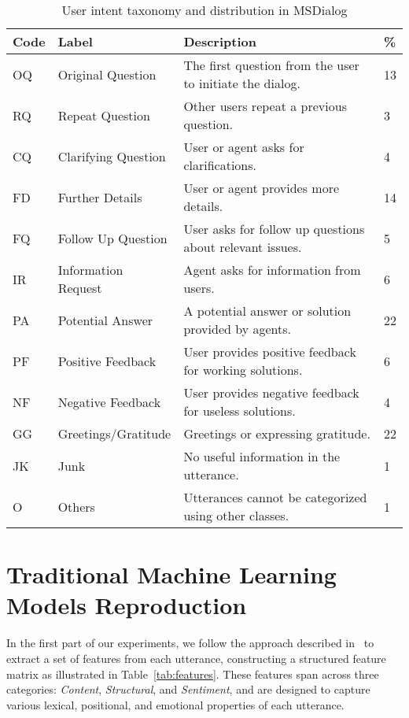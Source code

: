 \documentclass{article}
\begin{document}
\begin{table}[H]
\centering
\caption{User intent taxonomy and distribution in MSDialog}
\label{tab:taxonomy}
\begin{tabular}{llll}
\hline
\textbf{Code} & \textbf{Label} & \textbf{Description} & \textbf{\%} \\
\hline
OQ & Original Question & The first question from the user to initiate the dialog. & 13 \\
RQ & Repeat Question & Other users repeat a previous question. & 3 \\
CQ & Clarifying Question & User or agent asks for clarifications. & 4 \\
FD & Further Details & User or agent provides more details. & 14 \\
FQ & Follow Up Question & User asks for follow up questions about relevant issues. & 5 \\
IR & Information Request & Agent asks for information from users. & 6 \\
PA & Potential Answer & A potential answer or solution provided by agents. & 22 \\
PF & Positive Feedback & User provides positive feedback for working solutions. & 6 \\
NF & Negative Feedback & User provides negative feedback for useless solutions. & 4 \\
GG & Greetings/Gratitude & Greetings or expressing gratitude. & 22 \\
JK & Junk & No useful information in the utterance. & 1 \\
O & Others & Utterances cannot be categorized using other classes. & 1 \\
\hline
\end{tabular}
\end{table}

\section{Traditional Machine Learning Models Reproduction}

In the first part of our experiments, we follow the approach described in~\cite{qu2019user} to extract a set of features from each utterance, constructing a structured feature matrix as illustrated in Table~\ref{tab:features}. These features span across three categories: \textit{Content}, \textit{Structural}, and \textit{Sentiment}, and are designed to capture various lexical, positional, and emotional properties of each utterance.
\end{document}
